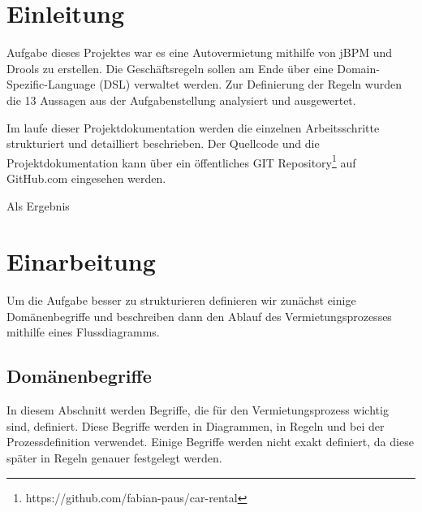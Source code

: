 



\setcounter{secnumdepth}{3}
\setcounter{tocdepth}{2}

\pagestyle{empty}


\tableofcontents
\setcounter{page}{1}

\pagestyle{scrheadings}

\newpage

\section{Einleitung}

Aufgabe dieses Projektes war es eine Autovermietung mithilfe von jBPM und Drools zu erstellen. Die Geschäftsregeln sollen am Ende über eine Domain-Spezific-Language (DSL) verwaltet werden. Zur Definierung der Regeln wurden die 13 Aussagen aus der Aufgabenstellung analysiert und ausgewertet. 

Im laufe dieser Projektdokumentation werden die einzelnen Arbeitsschritte strukturiert und detailliert beschrieben. Der Quellcode und die Projektdokumentation kann über ein öffentliches GIT Repository\footnote{https://github.com/fabian-paus/car-rental} auf GitHub.com eingesehen werden. 

Als Ergebnis 

\section{Einarbeitung}

Um die Aufgabe besser zu strukturieren definieren wir zunächst einige Domänenbegriffe und 
beschreiben dann den Ablauf des Vermietungsprozesses mithilfe eines Flussdiagramms.

\subsection{Domänenbegriffe}

In diesem Abschnitt werden Begriffe, die für den Vermietungsprozess wichtig sind, definiert.
Diese Begriffe werden in Diagrammen, in Regeln und bei der Prozessdefinition verwendet.
Einige Begriffe werden nicht exakt definiert, da diese später in Regeln genauer
festgelegt werden.

